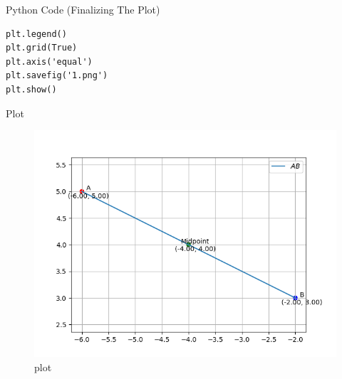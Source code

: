 \documentclass{beamer}
\begin{document}
\begin{frame}[fragile]{Python Code (Finalizing The Plot)}
\begin{verbatim}
plt.legend()
plt.grid(True)
plt.axis('equal')
plt.savefig('1.png')
plt.show()
\end{verbatim}
\end{frame}

\begin{frame}{Plot}
\begin{figure}[H]
\centering
\includegraphics[width=0.75\columnwidth]{figs/1.png}
\caption{\centering plot}
\label{fig:placeholder_125}
\end{figure}
\end{frame}
\end{document}
